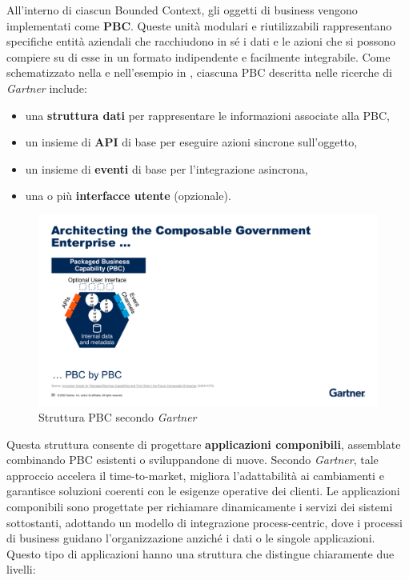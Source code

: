 All’interno di ciascun Bounded Context, gli oggetti di business vengono implementati come \textbf{\ac{PBC}}.
Queste unità modulari e riutilizzabili rappresentano specifiche entità aziendali che racchiudono in sé i dati e le azioni che
si possono compiere su di esse in un formato indipendente e facilmente integrabile. Come schematizzato nella 
e nell’esempio in , ciascuna \ac{PBC} descritta nelle ricerche di \textit{Gartner}\cite{natis2019innovation}\cite{burke2020top} include:

\begin{itemize}
    \item una \textbf{struttura dati} per rappresentare le informazioni associate alla \ac{PBC},
    \item un insieme di \textbf{API} di base per eseguire azioni sincrone sull'oggetto,
    \item un insieme di \textbf{eventi} di base per l'integrazione asincrona,
    \item una o più \textbf{interfacce utente} (opzionale).
\end{itemize}

\begin{figure}
    \centering
    \includegraphics[scale=0.6]{figures/PBCstructure.pdf}
    \caption{Struttura \ac{PBC} secondo \textit{Gartner}}
    \label{fig:pbc-struttura}
\end{figure}

Questa struttura consente di progettare \textbf{applicazioni componibili}, assemblate combinando \ac{PBC} esistenti o sviluppandone di nuove.
Secondo \textit{Gartner}, tale approccio accelera il time-to-market, migliora l’adattabilità ai cambiamenti e garantisce soluzioni coerenti
con le esigenze operative dei clienti. Le applicazioni componibili sono progettate per richiamare dinamicamente i servizi dei
sistemi sottostanti, adottando un modello di integrazione process-centric, dove i processi di business guidano l’organizzazione
anziché i dati o le singole applicazioni. Questo tipo di applicazioni hanno una struttura che distingue chiaramente due livelli:

